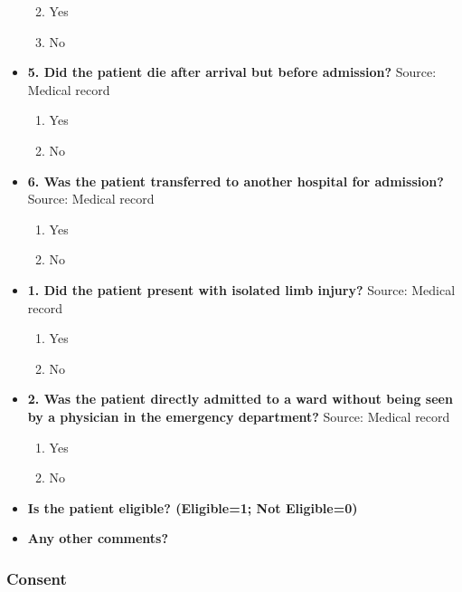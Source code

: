 \documentclass[
]{scrartcl}
\providecommand{\tightlist}{%
  \setlength{\itemsep}{0pt}\setlength{\parskip}{0pt}}\usepackage{longtable,booktabs,array}
\begin{document}
\begin{itemize}
  \begin{enumerate}
  \def\labelenumi{\arabic{enumi}.}
  \tightlist
  \item
    Yes
  \item
    No
  \end{enumerate}
\item
  \textbf{5. Did the patient die after arrival but before admission?}
  Source: Medical record

  \begin{enumerate}
  \def\labelenumi{\arabic{enumi}.}
  \tightlist
  \item
    Yes
  \item
    No
  \end{enumerate}
\item
  \textbf{6. Was the patient transferred to another hospital for
  admission?} Source: Medical record

  \begin{enumerate}
  \def\labelenumi{\arabic{enumi}.}
  \tightlist
  \item
    Yes
  \item
    No
  \end{enumerate}
\item
  \textbf{1. Did the patient present with isolated limb injury?} Source:
  Medical record

  \begin{enumerate}
  \def\labelenumi{\arabic{enumi}.}
  \tightlist
  \item
    Yes
  \item
    No
  \end{enumerate}
\item
  \textbf{2. Was the patient directly admitted to a ward without being
  seen by a physician in the emergency department?} Source: Medical
  record

  \begin{enumerate}
  \def\labelenumi{\arabic{enumi}.}
  \tightlist
  \item
    Yes
  \item
    No
  \end{enumerate}
\item
  \textbf{Is the patient eligible? (Eligible=1; Not Eligible=0)}
\item
  \textbf{Any other comments?}
\end{itemize}

\hypertarget{consent}{%
\subsubsection{Consent}\label{consent}}
\end{document}
